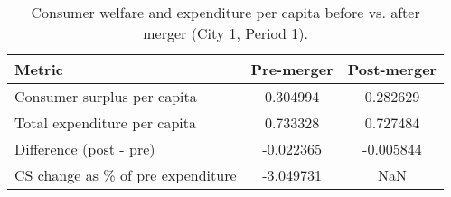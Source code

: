 \begin{table}[H]
\centering
\caption{Consumer welfare and expenditure per capita before vs. after merger (City 1, Period 1).}
\begin{tabular}{lcc}
\toprule
Metric & Pre-merger & Post-merger \\
\midrule
Consumer surplus per capita & 0.304994 & 0.282629 \\
Total expenditure per capita & 0.733328 & 0.727484 \\
Difference (post - pre) & -0.022365 & -0.005844 \\
CS change as \% of pre expenditure & -3.049731 & NaN \\
\bottomrule
\end{tabular}
\label{tab:q17_sum_c1t1}
\end{table}
